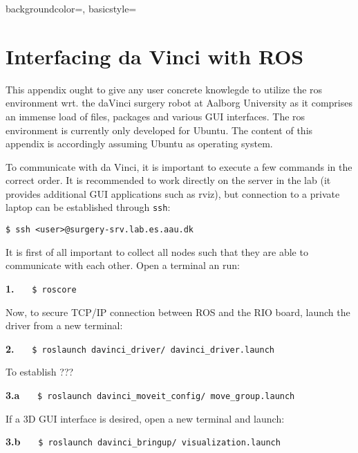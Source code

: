 {
    backgroundcolor=\color{black},
    basicstyle=\scriptsize\color{green}%
}
%
\chapter{Interfacing da Vinci with ROS}
This appendix ought to give any user concrete knowlegde to utilize the \gls{ros} environment wrt. the \gls{daVinci} surgery robot at Aalborg University as it comprises an immense load of files, packages and various GUI interfaces. The \gls{ros} environment is currently only developed for Ubuntu. The content of this appendix is accordingly assuming Ubuntu as operating system. 

To communicate with da Vinci, it is important to execute a few commands in the correct order. It is recommended to work directly on the server in the lab (it provides additional GUI applications such as rviz), but connection to a private laptop can be established through \texttt{ssh}:

\hspace{1cm} \texttt{\$ ssh <user>@surgery-srv.lab.es.aau.dk}

It is first of all important to collect all \gls{node}s such that they are able to communicate with each other. Open a terminal an run:

\hspace{1cm} \textbf{1.} \ \ \ \texttt{\$ roscore} \ \ \ {}

Now, to secure TCP/IP connection between ROS and the RIO board, launch the driver from a new terminal:

\hspace{1cm} \textbf{2.} \ \ \  \texttt{\$ roslaunch davinci\_driver/ davinci\_driver.launch} \ \ \ {} 

To establish ???

\hspace{1cm} \textbf{3.a} \ \ \  \texttt{\$ roslaunch davinci\_moveit\_config/ move\_group.launch} \ \ \ {} 

If a 3D GUI interface is desired, open a new terminal and launch:

\hspace{1cm} \textbf{3.b} \ \ \  \texttt{\$ roslaunch davinci\_bringup/ visualization.launch} \ \ \ {} 